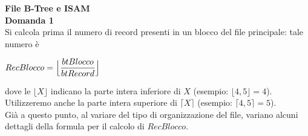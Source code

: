 \noindent\textbf{\fontsize{16pt}{1em}File B-Tree e ISAM}\\

\noindent\textbf{\fontsize{14pt}{1em}Domanda 1}\\
Si calcola prima il numero di record presenti in un blocco del file principale: tale numero è
\begin{center}
$RecBlocco = \Bigl\lfloor \dfrac{btBlocco}{btRecord} \Bigr\rfloor$
\end{center}
dove le $\bigl\lfloor X \bigr\rfloor$ indicano la parte intera inferiore di $X$ (esempio: $\bigl\lfloor 4,5 
\bigr\rfloor = 4$). Utilizzeremo anche la parte intera superiore di $\bigl\lceil X \bigr\rceil$ (esempio: $\bigl\lceil 4,5 
\bigr\rceil = 5$).\\

 Già a questo punto, al variare del tipo di organizzazione del file, variano alcuni dettagli della formula per il calcolo di
 $RecBlocco$.
